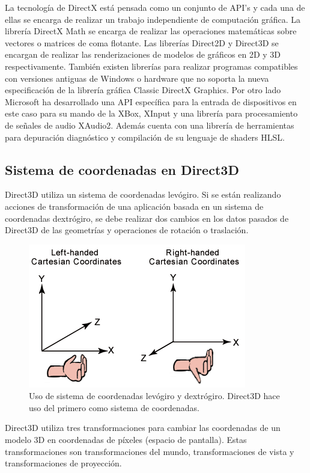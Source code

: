 \documentclass[a4paper, 17pt]{book}
\begin{document}
La tecnología de DirectX está pensada como un conjunto de API’s y cada una de ellas se encarga de realizar un trabajo
independiente de computación gráfica. La librería DirectX Math se encarga de realizar las operaciones matemáticas
sobre vectores o matrices de coma flotante. Las librerías Direct2D y Direct3D se encargan de realizar las renderizaciones
de modelos de gráficos en 2D y 3D respectivamente. También existen librerías para realizar programas compatibles con
versiones antiguas de Windows o hardware que no soporta la nueva especificación de la librería gráfica Classic DirectX
Graphics. Por otro lado Microsoft ha desarrollado una API específica para la entrada de dispositivos en este caso para su
mando de la XBox, XInput y una librería para procesamiento de señales de audio XAudio2. Además cuenta con una librería
de herramientas para depuración diagnóstico y compilación de su lenguaje de shaders HLSL.

\subsection{Sistema de coordenadas en Direct3D} 
\label{subsec:SysDirectX}

Direct3D utiliza un sistema de coordenadas levógiro. Si se están realizando acciones de transformación de una aplicación 
basada en un sistema de coordenadas dextrógiro, se debe realizar dos cambios en los datos pasados de Direct3D de las
geometrías y operaciones de rotación o traslación.

\begin{figure}[H]
    \centering
    \includegraphics[scale=0.50, keepaspectratio]{img/leftrght.png}
    \caption{Uso de sistema de coordenadas levógiro y dextrógiro. Direct3D hace uso del primero como sistema de coordenadas.}
    \label{figura:khronos}
\end{figure}

Direct3D utiliza tres transformaciones para cambiar las coordenadas de un modelo 3D en coordenadas de píxeles (espacio de pantalla).
Estas transformaciones son transformaciones del mundo, transformaciones de vista y transformaciones de proyección.
\end{document}
